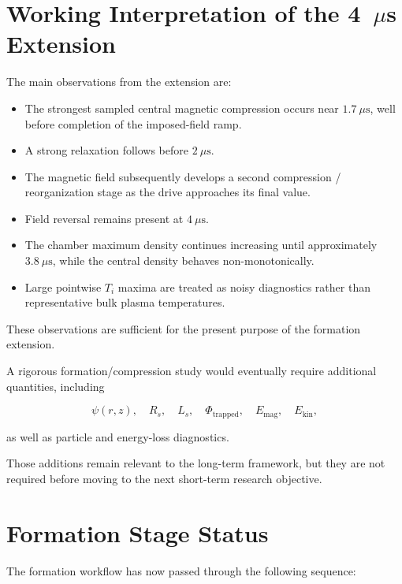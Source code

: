 \documentclass[11pt,a4paper]{article}
\begin{document}
\section{Working Interpretation of the 4~\texorpdfstring{$\mu$s}{us} Extension}

The main observations from the extension are:

\begin{itemize}
    \item The strongest sampled central magnetic compression occurs near
    \(1.7~\mu\mathrm{s}\), well before completion of the imposed-field ramp.
    \item A strong relaxation follows before \(2~\mu\mathrm{s}\).
    \item The magnetic field subsequently develops a second compression /
    reorganization stage as the drive approaches its final value.
    \item Field reversal remains present at \(4~\mu\mathrm{s}\).
    \item The chamber maximum density continues increasing until approximately
    \(3.8~\mu\mathrm{s}\), while the central density behaves non-monotonically.
    \item Large pointwise \(T_i\) maxima are treated as noisy diagnostics rather
    than representative bulk plasma temperatures.
\end{itemize}

These observations are sufficient for the present purpose of the formation
extension.

A rigorous formation/compression study would eventually require additional
quantities, including

\[
\psi(r,z),
\quad
R_s,
\quad
L_s,
\quad
\Phi_{\mathrm{trapped}},
\quad
E_{\mathrm{mag}},
\quad
E_{\mathrm{kin}},
\]

as well as particle and energy-loss diagnostics.

Those additions remain relevant to the long-term framework, but they are not
required before moving to the next short-term research objective.

\section{Formation Stage Status}

The formation workflow has now passed through the following sequence:
\end{document}
